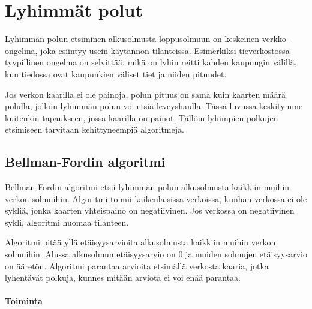 \chapter{Lyhimmät polut}


Lyhimmän polun etsiminen alkusolmusta loppusolmuun
on keskeinen verkko-ongelma, joka esiintyy usein
käytännön tilanteissa.
Esimerkiksi tieverkostossa
tyypillinen ongelma on selvittää,
mikä on lyhin reitti kahden kaupungin välillä,
kun tiedossa ovat kaupunkien väliset tiet ja niiden pituudet.

Jos verkon kaarilla ei ole painoja,
polun pituus on sama kuin kaarten
määrä polulla, jolloin lyhimmän polun
voi etsiä leveyshaulla.
Tässä luvussa keskitymme kuitenkin
tapaukseen, jossa kaarilla on painot.
Tällöin lyhimpien polkujen etsimiseen
tarvitaan kehittyneempiä algoritmeja.

\section{Bellman-Fordin algoritmi}


Bellman-Fordin algoritmi etsii
lyhimmän polun alkusolmusta
kaikkiin muihin verkon solmuihin.
Algoritmi toimii kaikenlaisissa verkoissa,
kunhan verkossa ei ole sykliä,
jonka kaarten yhteispaino on negatiivinen.
Jos verkossa on negatiivinen sykli,
algoritmi huomaa tilanteen.

Algoritmi pitää yllä etäisyysarvioita
alkusolmusta kaikkiin muihin verkon solmuihin.
Alussa alkusolmun etäisyysarvio on 0
ja muiden solmujen etäisyys\-arvio on ääretön.
Algoritmi parantaa arvioita
etsimällä verkosta kaaria,
jotka lyhentävät polkuja,
kunnes mitään arviota ei voi enää parantaa.

\subsubsection{Toiminta}

